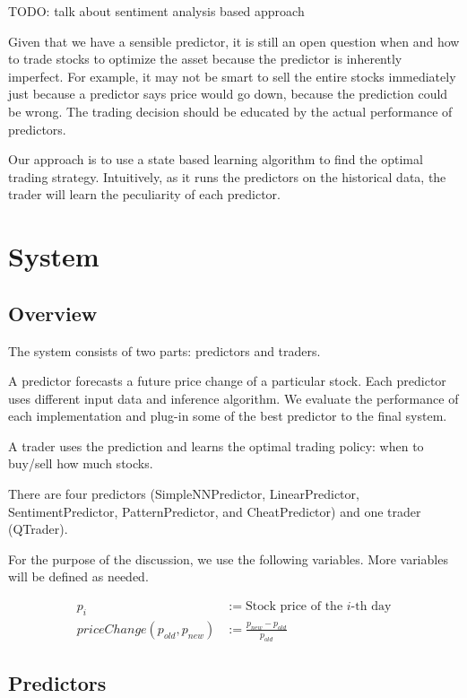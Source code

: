 \documentclass[twocolumn,10pt]{asme2ej}
\begin{document}
TODO: talk about sentiment analysis based approach

Given that we have a sensible predictor, it is still an open question
when and how to trade stocks to optimize the asset because the
predictor is inherently imperfect. For example, it may not be smart to
sell the entire stocks immediately just because a predictor says price
would go down, because the prediction could be wrong. The trading
decision should be educated by the actual performance of predictors.

Our approach is to use a state based learning algorithm to find the
optimal trading strategy. Intuitively, as it runs the predictors on
the historical data, the trader will learn the peculiarity of each
predictor. 

\section{System}

\subsection{Overview}

The system consists of two parts: predictors and traders.

A predictor forecasts a future price change of a particular
stock. Each predictor uses different input data and inference
algorithm. We evaluate the performance of each implementation and
plug-in some of the best predictor to the final system.

A trader uses the prediction and learns the optimal trading policy:
when to buy/sell how much stocks.

There are four predictors (SimpleNNPredictor, LinearPredictor,
SentimentPredictor, PatternPredictor, and CheatPredictor) and one
trader (QTrader). 

For the purpose of the discussion, we use the following
variables. More variables will be defined as needed.

\begin{align*}
p_i &:= \text{Stock price of the }i\text{-th day} \\
priceChange(p_{old}, p_{new}) &:= \frac{p_{new} - p_{old}}{p_{old}}
\end{align*}

\subsection{Predictors}
\end{document}
